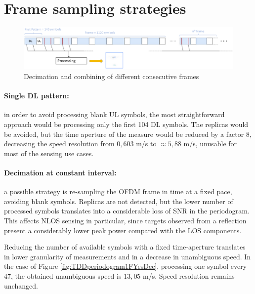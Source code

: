 \section{Frame sampling strategies}

    \begin{figure}[H]
        \centering
        \includegraphics[width=1\textwidth]{Images/TDDprocessing/TDDstrategies.eps}
        \caption{Decimation and combining of different consecutive frames}
        \label{fig:TDDstrategies}
    \end{figure}

    \paragraph{Single DL pattern:}
    in order to avoid processing blank UL symbols, the most straightforward approach would be processing only the first 104 DL symbols. The replicas would be avoided, but the time aperture of the measure would be reduced by a factor 8, decreasing the speed resolution from $0,603$ m/s to $\approx 5,88$ m/s, unusable for most of the sensing use cases.
    
    \paragraph{Decimation at constant interval:}
     a possible strategy is re-sampling the OFDM frame in time at a fixed pace, avoiding blank symbols. Replicas are not detected, but the lower number of processed symbols translates into a considerable loss of SNR in the periodogram. This affects NLOS sensing in particular, since targets observed from a reflection present a considerably lower peak power compared with the LOS components.

     Reducing the number of available symbols with a fixed time-aperture translates in lower granularity of measurements and in a decrease in unambiguous speed. \protect\newline In the case of Figure \ref{fig:TDDperiodogram1FYesDec}, processing one symbol every 47, the obtained unambiguous speed is $13,05$ m/s. \protect\newline Speed resolution remains unchanged.
    
